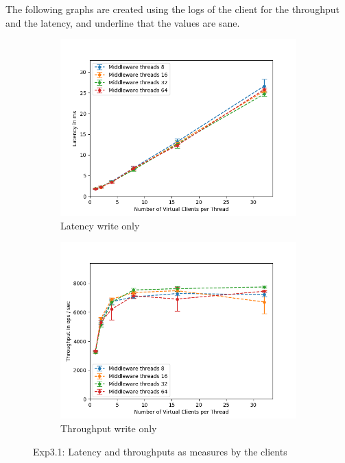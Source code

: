 \documentclass[11pt,a4paper]{article}
\begin{document}
The following graphs are created using the logs of the client for the throughput and the latency, and underline that the values are sane.

\begin{figure}[H]
\centering
\begin{subfigure}{.5\textwidth}
    \centering
    \includegraphics[width=\textwidth]{img/exp3_1/exp3_1__latency_client_write_1.png}
    \caption{Latency write only}
    \label{fig:mesh1}
\end{subfigure}%
\begin{subfigure}{.5\textwidth}
      \centering
    \includegraphics[width=\textwidth]{img/exp3_1/exp3_1__throughput_client_write_1.png}
    \caption{Throughput write only}
    \label{fig:mesh1}
\end{subfigure}
\caption{Exp3.1: Latency and throughputs as measures by the clients}
\label{fig:test}
\end{figure}
\end{document}
